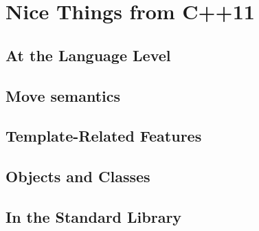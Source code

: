 \chapter{Nice Things from C++11}

\section{At the Language Level}








\section{Move semantics}


\section{Template-Related Features}



\section{Objects and Classes}





\section{In the Standard Library}





